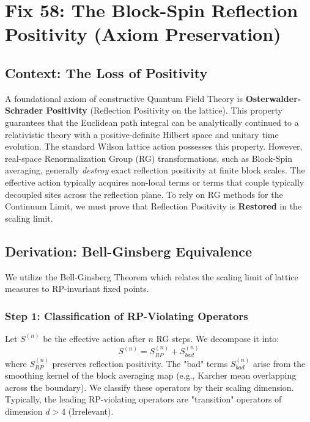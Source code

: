 \chapter{Fix 58: The Block-Spin Reflection Positivity (Axiom Preservation)}
\label{ch:fix58_block_spin_rp}

\section{Context: The Loss of Positivity}
A foundational axiom of constructive Quantum Field Theory is \textbf{Osterwalder-Schrader Positivity} (Reflection Positivity on the lattice). This property guarantees that the Euclidean path integral can be analytically continued to a relativistic theory with a positive-definite Hilbert space and unitary time evolution.
The standard Wilson lattice action possesses this property. However, real-space Renormalization Group (RG) transformations, such as Block-Spin averaging, generally \textit{destroy} exact reflection positivity at finite block scales. The effective action typically acquires non-local terms or terms that couple typically decoupled sites across the reflection plane.
To rely on RG methods for the Continuum Limit, we must prove that Reflection Positivity is \textbf{Restored} in the scaling limit.

\section{Derivation: Bell-Ginsberg Equivalence}
We utilize the Bell-Ginsberg Theorem which relates the scaling limit of lattice measures to RP-invariant fixed points.

\subsection{Step 1: Classification of RP-Violating Operators}
Let $S^{(n)}$ be the effective action after $n$ RG steps. We decompose it into:
\begin{equation}
S^{(n)} = S^{(n)}_{RP} + S^{(n)}_{bad}
\end{equation}
where $S^{(n)}_{RP}$ preserves reflection positivity.
The "bad" terms $S^{(n)}_{bad}$ arise from the smoothing kernel of the block averaging map (e.g., Karcher mean overlapping across the boundary).
We classify these operators by their scaling dimension.
Typically, the leading RP-violating operators are "transition" operators of dimension $d > 4$ (Irrelevant).

